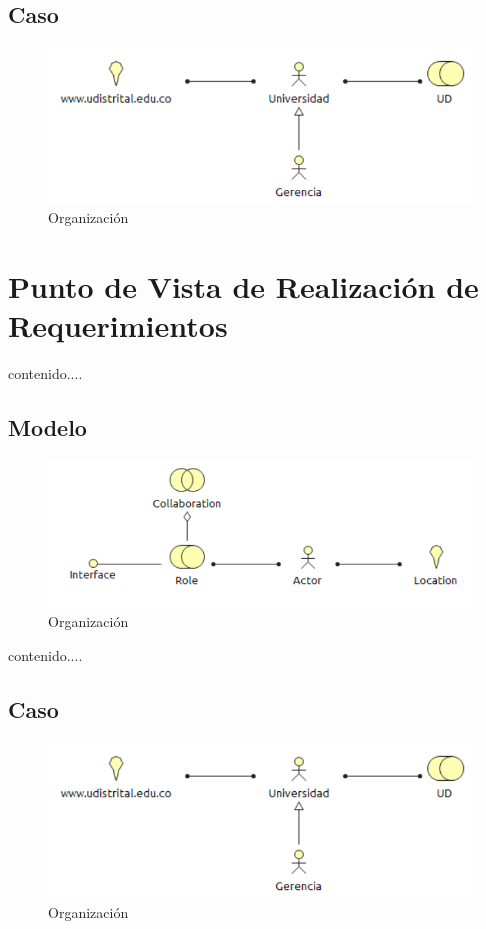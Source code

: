 \subsection{Caso}
\begin{figure}[th!]
	\centering
	\includegraphics[width=0.8\linewidth]{arquitectura_diseno/imgs/C_Organizacion}
	\caption{Organización}
\end{figure}
\newpage
\section{Punto de Vista de Realización de Requerimientos}
contenido....
\subsection{Modelo}
\begin{figure}[th!]
	\centering
	\includegraphics[width=0.8\linewidth]{arquitectura_diseno/imgs/M_Organizacion}
	\caption{Organización}
\end{figure}
\newpage
contenido....
\subsection{Caso}
\begin{figure}[th!]
	\centering
	\includegraphics[width=0.8\linewidth]{arquitectura_diseno/imgs/C_Organizacion}
	\caption{Organización}
\end{figure}
\newpage
